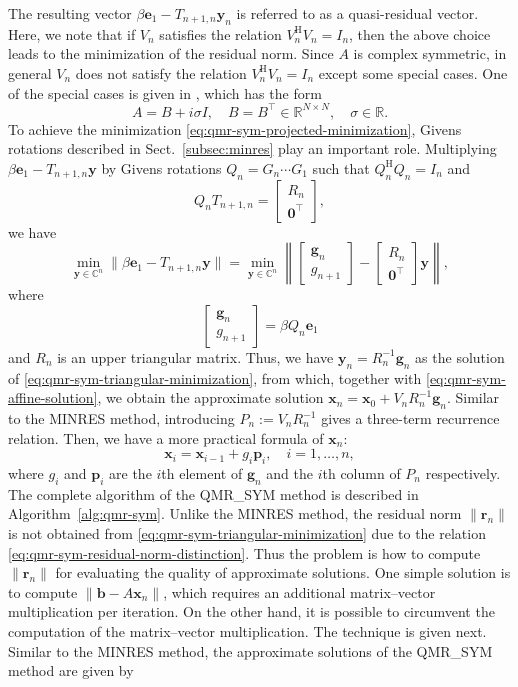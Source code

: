 {The resulting vector $\beta\bm e_1-T_{n+1,n}\bm y_n$ is referred to as a quasi-residual vector. Here, we note that if $V_n$ satisfies the relation $V_n^{\mathrm H}V_n=I_n$, then the above choice leads to the minimization of the residual norm. Since $A$ is complex symmetric, in general $V_n$ does not satisfy the relation $V_n^{\mathrm H}V_n=I_n$ except some special cases. One of the special cases is given in , which has the form}
\[A=B+i\sigma I,\quad B=B^{\top}\in\mathbb R^{N\times N},\quad\sigma\in\mathbb R.\]
{To achieve the minimization \eqref{eq:qmr-sym-projected-minimization}, Givens rotations described in Sect.\ \ref{subsec:minres} play an important role. Multiplying $\beta\bm e_1-T_{n+1,n}\bm y$ by Givens rotations $Q_n=G_n\cdots G_1$ such that $Q_n^{\mathrm H}Q_n=I_n$ and}
\[Q_nT_{n+1,n}=\begin{bmatrix}R_n\\\bm0^{\top}\end{bmatrix},\]
{we have}
\begin{equation}\label{eq:qmr-sym-triangular-minimization}
\min_{\bm y\in\mathbb C^n}\|\beta\bm e_1-T_{n+1,n}\bm y\|=\min_{\bm y\in\mathbb C^n}\left\|\begin{bmatrix}\bm g_n\\g_{n+1}\end{bmatrix}-\begin{bmatrix}R_n\\\bm0^{\top}\end{bmatrix}\bm y\right\|,
\end{equation}
{where}
\[\begin{bmatrix}\bm g_n\\g_{n+1}\end{bmatrix}=\beta Q_n\bm e_1\]
{and $R_n$ is an upper triangular matrix. Thus, we have $\bm y_n=R_n^{-1}\bm g_n$ as the solution of \eqref{eq:qmr-sym-triangular-minimization}, from which, together with \eqref{eq:qmr-sym-affine-solution}, we obtain the approximate solution $\bm x_n=\bm x_0+V_nR_n^{-1}\bm g_n$. Similar to the MINRES method, introducing $P_n:=V_nR_n^{-1}$ gives a three-term recurrence relation. Then, we have a more practical formula of $\bm x_n$:}
\[\bm x_i=\bm x_{i-1}+g_i\bm p_i,\quad i=1,\ldots,n,\]
{where $g_i$ and $\bm p_i$ are the $i$th element of $\bm g_n$ and the $i$th column of $P_n$ respectively. The complete algorithm of the QMR\_SYM method is described in Algorithm\ \ref{alg:qmr-sym}. Unlike the MINRES method, the residual norm $\|\bm r_n\|$ is not obtained from \eqref{eq:qmr-sym-triangular-minimization} due to the relation \eqref{eq:qmr-sym-residual-norm-distinction}. Thus the problem is how to compute $\|\bm r_n\|$ for evaluating the quality of approximate solutions. One simple solution is to compute $\|\bm b-A\bm x_n\|$, which requires an additional matrix--vector multiplication per iteration. On the other hand, it is possible to circumvent the computation of the matrix--vector multiplication. The technique is given next. Similar to the MINRES method, the approximate solutions of the QMR\_SYM method are given by}

